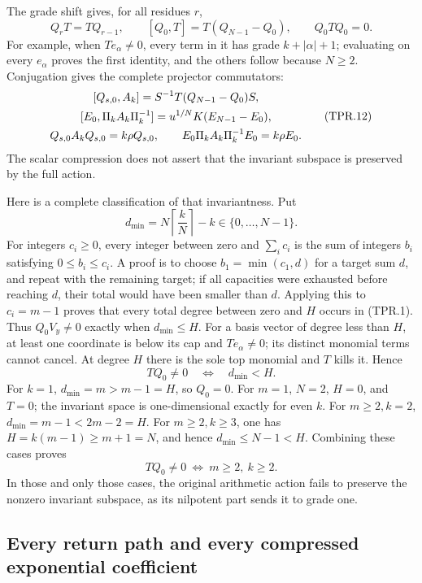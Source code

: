 The grade shift gives, for all residues \(r\),
\[
 Q_rT=TQ_{r-1},\qquad
 [Q_0,T]=T(Q_{N-1}-Q_0),\qquad Q_0TQ_0=0.
 \tag{TPR.11}
\]
For example, when \(Te_\alpha\ne0\), every term in it has
grade \(k+|\alpha|+1\); evaluating on every \(e_\alpha\) proves
the first identity, and the others follow because \(N\geq2\).
Conjugation gives the complete projector commutators:
\[
 \begin{gathered}
 \relax[Q_{s,0},A_k]=S^{-1}T(Q_{N-1}-Q_0)S,\\
 [E_0,\Pi_kA_k\Pi_k^{-1}]
       =u^{1/N}K(E_{N-1}-E_0),\\
 Q_{s,0}A_kQ_{s,0}=k\rho Q_{s,0},\qquad
 E_0\Pi_kA_k\Pi_k^{-1}E_0=k\rho E_0.
 \end{gathered}
 \tag{TPR.12}
\]
The scalar compression does not assert that the invariant subspace
is preserved by the full action.

Here is a complete classification of that invariantness.
Put
\[
 d_{\min}=N\left\lceil\frac{k}{N}\right\rceil-k
       \in\{0,\ldots,N-1\}.
 \tag{TPR.13}
\]
For integers \(c_i\geq0\), every integer between zero and
\(\sum_i c_i\) is the sum of integers \(b_i\) satisfying
\(0\leq b_i\leq c_i\). A proof is to choose
\(b_1=\min(c_1,d)\) for a target sum \(d\), and repeat with
the remaining target; if all capacities were exhausted before
reaching \(d\), their total would have been smaller than \(d\).
Applying this to \(c_i=m-1\) proves that every total degree
between zero and \(H\) occurs in (TPR.1).
Thus \(Q_0V_y\ne0\) exactly when \(d_{\min}\leq H\).
For a basis vector of degree less than \(H\), at least one
coordinate is below its cap and \(Te_\alpha\ne0\); its distinct
monomial terms cannot cancel. At degree \(H\) there is the sole
top monomial and \(T\) kills it. Hence
\[
 TQ_0\ne0
     \quad\Longleftrightarrow\quad d_{\min}<H.
 \tag{TPR.14}
\]
For \(k=1\), \(d_{\min}=m>m-1=H\), so \(Q_0=0\).
For \(m=1\), \(N=2\), \(H=0\), and \(T=0\); the invariant
space is one-dimensional exactly for even \(k\).
For \(m\geq2,k=2\), \(d_{\min}=m-1<2m-2=H\).
For \(m\geq2,k\geq3\), one has
\(H=k(m-1)\geq m+1=N\), and hence
\(d_{\min}\leq N-1<H\).
Combining these cases proves
\[
 \boxed{\ TQ_0\ne0
            \ \Longleftrightarrow\ m\geq2,\ k\geq2.\ }
 \tag{TPR.15}
\]
In those and only those cases, the original arithmetic action
fails to preserve the nonzero invariant subspace, as its
nilpotent part sends it to grade one.

\subsection*{Every return path and every compressed exponential coefficient}

